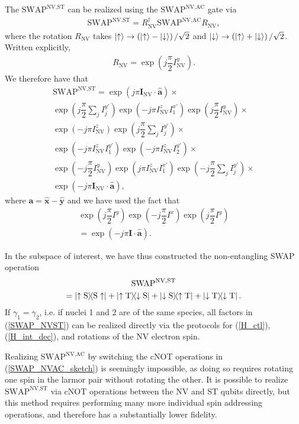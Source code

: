 \documentclass[twocolumn]{revtex4}
\renewcommand{\t}{\text} %
\newcommand{\f}[2]{\dfrac{#1}{#2}} %
\newcommand{\p}[1]{\left(#1\right)} %
\renewcommand{\v}{\bm} %
\newcommand{\uv}[1]{\hat{\v{#1}}} %
\renewcommand{\c}{\cdot} %
\renewcommand{\u}{\uparrow}
\renewcommand{\d}{\downarrow}
\newcommand{\SWAP}{\t{SWAP}}
\newcommand{\NV}{\t{NV}}
\newcommand{\AC}{\t{AC}}
\newcommand{\ST}{\t{ST}}
\renewcommand{\S}{\t{S}}
\newcommand{\T}{\t{T}}
\begin{document}
The $\SWAP^{\NV,\ST}$ can be realized using the $\SWAP^{\NV,\AC}$ gate
via
\begin{align}
  \SWAP^{\NV,\ST} = R_\NV^\dagger \SWAP^{\NV,\AC} R_\NV,
\end{align}
where the rotation $R_\NV$ takes $\ket\u\to\p{\ket\u-\ket\d}/\sqrt2$
and $\ket\d\to\p{\ket\u+\ket\d}/\sqrt2$. Written explicitly,
\begin{align}
  R_\NV = \exp\p{j\f\pi2 I_\NV^y}.
\end{align}
We therefore have that
\begin{multline}
  \SWAP^{\NV,\ST} = \exp\p{j\pi\v I_\NV\c\uv a}
  \times \\
  \exp\p{j\f\pi2\sum_jI_j^{y'}}
  \exp\p{-j\pi I_\NV^z I_1^{x'}}
  \exp\p{j\f\pi2 I_\NV^y}
  \times \\
  \exp\p{-j\pi I_\NV^z} \exp\p{j\f\pi2\sum_jI_j^{y'}}
  \times \\
  \exp\p{-j\pi I_\NV^z I_1^{y'}}
  \exp\p{-j\pi I_\NV^z I_2^{y'}}
  \times \\
  \exp\p{-j\f\pi2 I_\NV^y}
  \exp\p{j\pi I_\NV^z I_1^{x'}}
  \exp\p{-j\f\pi2\sum_jI_j^{y'}}
  \times \\
  \exp\p{-j\pi\v I_\NV\c\uv a},
  \label{SWAP_NVST}
\end{multline}
where $\v a = \uv x - \uv y$ and we have used the fact that
\begin{multline}
  \exp\p{j\f\pi2 I^y} \exp\p{-j\f\pi2 I^x}
  \exp\p{j\f\pi2 I^y} \\
  = \exp\p{-j\pi\v I\c\uv a}.
\end{multline}

In the subspace of interest, we have thus
constructed the non-entangling SWAP operation
\begin{multline}
  \SWAP^{\NV,\ST} \\
  = \op{\u\S}{\S\u} + \op{\u\T}{\d\S} + \op{\d\S}{\u\T} +
  \op{\d\T}{\d\T}.
\end{multline}
If $\gamma_1=\gamma_2$, i.e. if nuclei 1 and 2 are of the same
species, all factors in (\ref{SWAP_NVST}) can be realized directly via
the protocols for (\ref{H_ctl}), (\ref{H_int_dec}), and rotations of
the NV electron spin.

Realizing $\SWAP^{\NV,\AC}$ by switching the cNOT operations in
(\ref{SWAP_NVAC_sketch}) is seemingly impossible, as doing so requires
rotating one spin in the larmor pair without rotating the other. It is
possible to realize $\SWAP^{\NV,\ST}$ via cNOT operations between the
NV and ST qubits directly, but this method requires performing many
more individual spin addressing operations, and therefore has a
substantially lower fidelity.
\end{document}
